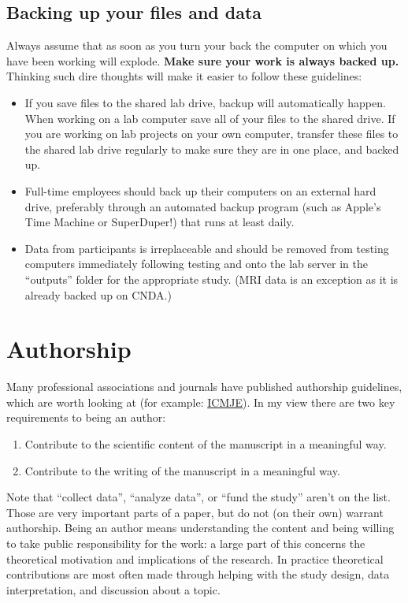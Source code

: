 \documentclass[letterpaper,12pt,oneside]{memoir}
\begin{document}
\subsection{Backing up your files and data}

Always assume that as soon as you turn your back the computer on which you have been working will explode. \textbf{Make sure your work is always backed up.} Thinking such dire thoughts will make it easier to follow these guidelines:

\begin{itemize}
\item If you save files to the shared lab drive, backup will automatically happen. When working on a lab computer save all of your files to the shared drive. If you are working on lab projects on your own computer, transfer these files to the shared lab drive regularly to make sure they are in one place, and backed up.
\item Full-time employees should back up their computers on an external hard drive, preferably through an automated backup program (such as Apple's Time Machine or SuperDuper!) that runs at least daily.
\item Data from participants is irreplaceable and should be removed from testing computers immediately following testing and onto the lab server in the ``outputs'' folder for the appropriate study. (MRI data is an exception as it is already backed up on CNDA.)
\end{itemize}


\section{Authorship}
Many professional associations and journals have published authorship guidelines, which are worth looking at (for example: \href{http://www.icmje.org/recommendations/browse/roles-and-responsibilities/defining-the-role-of-authors-and-contributors.html}{ICMJE}). In my view there are two key requirements to being an author:

\begin{enumerate}
\item{Contribute to the scientific content of the manuscript in a meaningful way.}
\item{Contribute to the writing of the manuscript in a meaningful way.}
\end{enumerate}

Note that ``collect data'', ``analyze data'', or ``fund the study'' aren't on the list. Those are very important parts of a paper, but do not (on their own) warrant authorship. Being an author means understanding the content and being willing to take public responsibility for the work: a large part of this concerns the theoretical motivation and implications of the research. In practice theoretical contributions are most often made through helping with the study design, data interpretation, and discussion about a topic.
\end{document}
